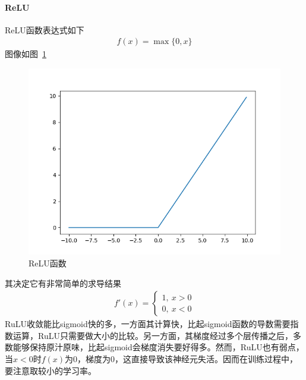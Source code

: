 \paragraph{ReLU}
ReLU函数表达式如下
\begin{eqnarray}
f(x)=\max\{0,x\}
\end{eqnarray}
图像如图~\ref{fig:bp4}
\begin{figure}[htb]
\centering
\includegraphics[scale=0.5]{../figures/NN5.png} 
\caption{ReLU函数}
\label{fig:bp4}
\end{figure}
其决定它有非常简单的求导结果
\begin{eqnarray}
f'(x)=
\left\lbrace
\begin{aligned}
1,\ x>0\\
0,\ x<0
\end{aligned}
\right.
\end{eqnarray}
RuLU收敛能比sigmoid快的多，一方面其计算快，比起sigmoid函数的导数需要指数运算，RuLU只需要做大小的比较。另一方面，其梯度经过多个层传播之后，多数能够保持原汁原味，比起sigmoid会梯度消失要好得多。然而，RuLU也有弱点，当$x<0$时$f(x)$为0，梯度为0，这直接导致该神经元失活。因而在训练过程中，要注意取较小的学习率。
